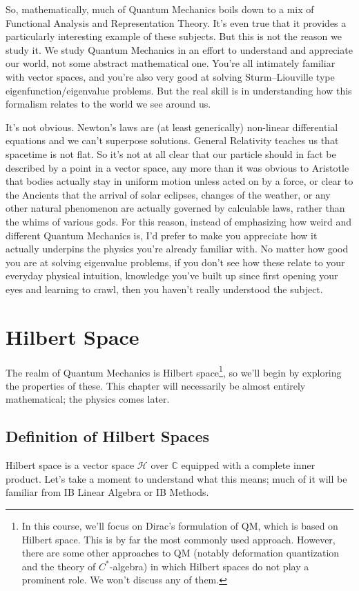 \documentclass{article}
\theoremstyle{plain}\theoremheaderfont{\normalfont\itshape}\theorembodyfont{\rmfamily}\theoremseparator{.}\newtheorem*{rem}{Remark}\newtheorem*{ex}{Example}\newtheorem*{proof}{Proof}\newtheorem*{altp}{Alternative proof}
\theoremstyle{plain}\theoremheaderfont{\normalfont\bfseries}\theorembodyfont{\rmfamily}\theoremseparator{.}\newtheorem{thm}{Theorem}[section]\newtheorem{lem}[thm]{Lemma}\newtheorem{prop}[thm]{Proposition}\newtheorem*{cor}{Corollary}\newtheorem{defn}[thm]{Definition}\newtheorem{clm}[thm]{Claim}\newtheorem{clminproof}{Claim}
\theoremstyle{break}\theoremheaderfont{\normalfont\itshape}\theorembodyfont{\rmfamily}\theoremseparator{.\medskip}\newtheorem*{proofskip}{Proof}\newtheorem*{exs}{Examples}\newtheorem*{rems}{Remarks}
\theoremstyle{break}\theoremheaderfont{\normalfont\bfseries}\theorembodyfont{\rmfamily}\theoremseparator{.\medskip}\newtheorem{lemskip}[thm]{Lemma}\newtheorem{defnskip}[thm]{Definition}\newtheorem{propskip}[thm]{Proposition}\newtheorem{thmskip}[thm]{Theorem}
\numberwithin{equation}{section}
\newcommand{\hb}{\mathcal{H}}
\newcommand{\CC}{\mathbb{C}}
\begin{document}
    So, mathematically, much of Quantum Mechanics boils down to a mix of Functional Analysis and Representation Theory. It's even true that it provides a particularly interesting example of these subjects. But this is not the reason we study it. We study Quantum Mechanics in an effort to understand and appreciate our world, not some abstract mathematical one. You're all intimately familiar with vector spaces, and you're also very good at solving Sturm--Liouville type eigenfunction/eigenvalue problems. But the real skill is in understanding how this formalism relates to the world we see around us.

    It's not obvious. Newton's laws are (at least generically) non-linear differential equations and we can't superpose solutions. General Relativity teaches us that spacetime is not flat. So it's not at all clear that our particle should in fact be described by a point in a vector space, any more than it was obvious to Aristotle that bodies actually stay in uniform motion unless acted on by a force, or clear to the Ancients that the arrival of solar eclipses, changes of the weather, or any other natural phenomenon are actually governed by calculable laws, rather than the whims of various gods. For this reason, instead of emphasizing how weird and different Quantum Mechanics is, I'd prefer to make you appreciate how it actually underpins the physics you're already familiar with. No matter how good you are at solving eigenvalue problems, if you don't see how these relate to your everyday physical intuition, knowledge you've built up since first opening your eyes and learning to crawl, then you haven't really understood the subject.

    \newpage
    \section{Hilbert Space}
    The realm of Quantum Mechanics is Hilbert space\footnote{In this course, we'll focus on Dirac's formulation of QM, which is based on Hilbert space. This is by far the most commonly used approach. However, there are some other approaches to QM (notably deformation quantization and the theory of \(C^*\)-algebra) in which Hilbert spaces do not play a prominent role. We won't discuss any of them.}, so we'll begin by exploring the properties of these. This chapter will necessarily be almost entirely mathematical; the physics comes later.

    \subsection{Definition of Hilbert Spaces}
    Hilbert space is a vector space \(\hb\) over \(\CC\) equipped with a complete inner product. Let's take a moment to understand what this means; much of it will be familiar from IB Linear Algebra or IB Methods.
\end{document}
